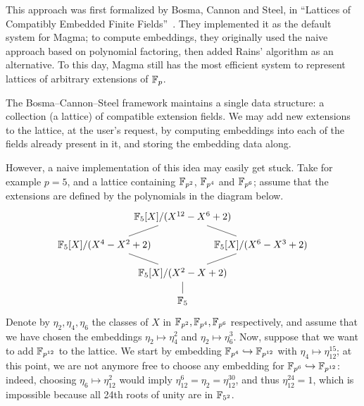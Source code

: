 \documentclass[b5layout]{hdr}
\begin{document}
This approach was first formalized by Bosma, Cannon and Steel, in
``Lattices of Compatibly Embedded Finite
Fields''~\cite{bosma+cannon+steel97}. %
They implemented it as the default system for Magma; to compute
embeddings, they originally used the naive approach based on
polynomial factoring, then added Rains' algorithm as an alternative. %
To this day, Magma still has the most efficient system to represent
lattices of arbitrary extensions of $\mathbb{F}_p$. %

The Bosma--Cannon--Steel framework maintains a single data structure:
a collection (a lattice) of compatible extension fields. %
We may add new extensions to the lattice, at the user's request, by
computing embeddings into each of the fields already present in it,
and storing the embedding data along. %

However, a naive implementation of this idea may easily get stuck. %
Take for example $p=5$, and a lattice containing $\mathbb{F}_{p^2}$,
$\mathbb{F}_{p^4}$ and $\mathbb{F}_{p^6}$; assume that the extensions are defined by
the polynomials in the diagram below. %
\begin{equation*}
  \begin{tikzpicture}
    \draw
    (0,-1) node (F0) {$\F_5$}
    (0,0) node(Fp) {$\F_5[X]/(X^2-X+2)$}
    (-1,1) node[anchor=east](Fpm) {$\F_5[X]/(X^4-X^2+2)$}
    (1,1) node[anchor=west](Fpn) {$\F_5[X]/(X^6-X^3+2)$}
    (0,2) node(Fpmn) {$\F_5[X]/(X^{12}-X^6+2)$};
    \draw
    (Fp) edge (Fpm) edge (Fpn) edge (F0)
    (Fpmn) edge (Fpm) edge (Fpn);
  \end{tikzpicture}
\end{equation*}
Denote by $η_2,η_4,η_6$ the classes of $X$ in
$\mathbb{F}_{p^2},\mathbb{F}_{p^4},\mathbb{F}_{p^6}$ respectively, and assume that we have
chosen the embeddings $η_2↦η_4^2$ and $η_2↦η_6^3$. %
Now, suppose that we want to add $\mathbb{F}_{p^{12}}$ to the lattice. %
We start by embedding $\mathbb{F}_{p^4}\hookrightarrow\mathbb{F}_{p^{12}}$ with
$η_4↦η_{12}^{15}$; at this point, we are not anymore free to choose
any embedding for $\mathbb{F}_{p^6}\hookrightarrow\mathbb{F}_{p^{12}}$: indeed,
choosing $η_6↦η_{12}^2$ would imply $η_{12}^{6}=η_2=η_{12}^{30}$, and
thus $η_{12}^{24}=1$, which is impossible because all 24th roots of
unity are in $\mathbb{F}_{5^2}$. %
\end{document}
